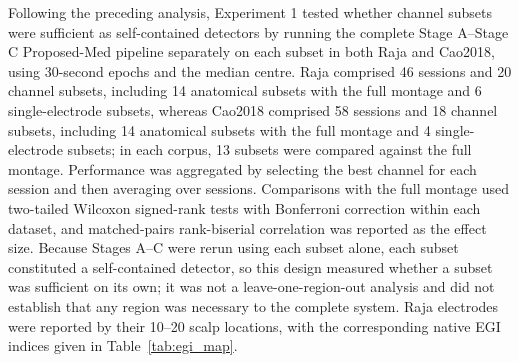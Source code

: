 Following the preceding analysis, Experiment 1 tested whether channel subsets were sufficient as self-contained detectors by running the complete Stage A--Stage C Proposed-Med pipeline separately on each subset in both Raja and Cao2018, using 30-second epochs and the median centre. Raja comprised 46 sessions and 20 channel subsets, including 14 anatomical subsets with the full montage and 6 single-electrode subsets, whereas Cao2018 comprised 58 sessions and 18 channel subsets, including 14 anatomical subsets with the full montage and 4 single-electrode subsets; in each corpus, 13 subsets were compared against the full montage. Performance was aggregated by selecting the best channel for each session and then averaging over sessions. Comparisons with the full montage used two-tailed Wilcoxon signed-rank tests with Bonferroni correction within each dataset, and matched-pairs rank-biserial correlation was reported as the effect size. Because Stages A--C were rerun using each subset alone, each subset constituted a self-contained detector, so this design measured whether a subset was sufficient on its own; it was not a leave-one-region-out analysis and did not establish that any region was necessary to the complete system. Raja electrodes were reported by their 10--20 scalp locations, with the corresponding native EGI indices given in Table~\ref{tab:egi_map}.

